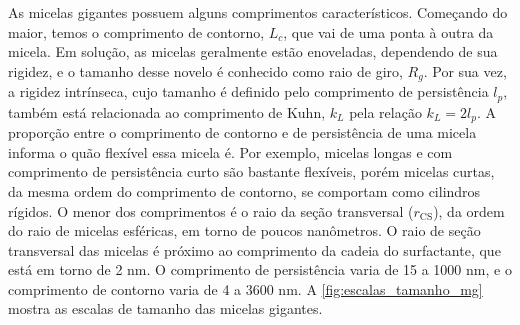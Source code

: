 		As micelas gigantes possuem alguns comprimentos característicos. Começando do maior, temos o comprimento de contorno, \(L_c\), que vai de uma ponta à outra da micela. Em solução, as micelas geralmente estão enoveladas, dependendo de sua rigidez, e o tamanho desse novelo é conhecido como raio de giro, \(R_g\).  Por sua vez, a rigidez intrínseca, cujo tamanho é definido pelo comprimento de persistência \(l_p\), também está relacionada ao comprimento de Kuhn, \(k_L\) pela relação \(k_L=2l_p\).\cite{Dreiss2007} A proporção entre o comprimento de contorno e de persistência de uma micela informa o quão flexível essa micela é. Por exemplo, micelas longas e com comprimento de persistência curto são bastante flexíveis, porém micelas curtas, da mesma ordem do comprimento de contorno, se comportam como cilindros rígidos. O menor dos comprimentos é o raio da seção transversal (\(r_{\mathrm{CS}}\)), da ordem do raio de micelas esféricas, em torno de poucos nanômetros. O raio de seção transversal das micelas é próximo ao comprimento da cadeia do surfactante, que está em torno de 2 nm. O comprimento de persistência varia de 15 a 1000 nm, e o comprimento de contorno varia de 4 a 3600 nm.\cite{Dreiss2007} A \autoref{fig:escalas_tamanho_mg} mostra as escalas de tamanho das micelas gigantes.
		
